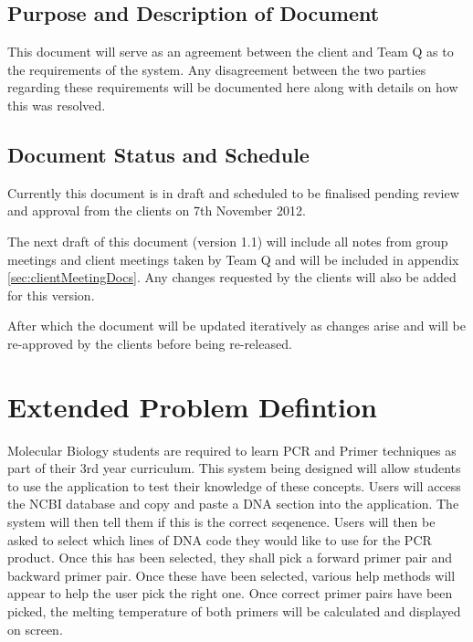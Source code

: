 \documentclass{l3deliverable}
\begin{document}
\subsection{Purpose and Description of Document}

This document will serve as an agreement between the client and Team
Q as to the requirements of the system. Any disagreement between the
two parties regarding these requirements will be documented here along
with details on how this was resolved.

\subsection{Document Status and Schedule}

Currently this document is in draft and scheduled to be finalised
pending review and approval from the clients on 7th November 2012.

The next draft of this document (version 1.1) will include all notes from group
meetings and client meetings taken by Team Q and will be included in
appendix \ref{sec:clientMeetingDocs}.
Any changes requested by the clients will also be added for this version.

After which the document will be updated iteratively as changes
arise and will be re-approved by the clients before being re-released.

\section{Extended Problem Defintion}
\label{sec:extendedDefinition}


Molecular Biology students are required to learn PCR and Primer
techniques as part of their 3rd year curriculum. 
This system being designed will allow students to use the application
to test their knowledge of these concepts. 
Users will access the NCBI database and copy and paste a DNA section
into the application. 
The system will then tell them if this is the correct seqenence. 
Users will then be asked to select which lines of DNA code they would
like to use for the PCR product. 
Once this has been selected, they shall pick a forward primer pair and
backward primer pair. 
Once these have been selected, various help methods will appear to
help the user pick the right one. 
Once correct primer pairs have been picked, the melting temperature of
both primers will be calculated and displayed on screen.
\end{document}
